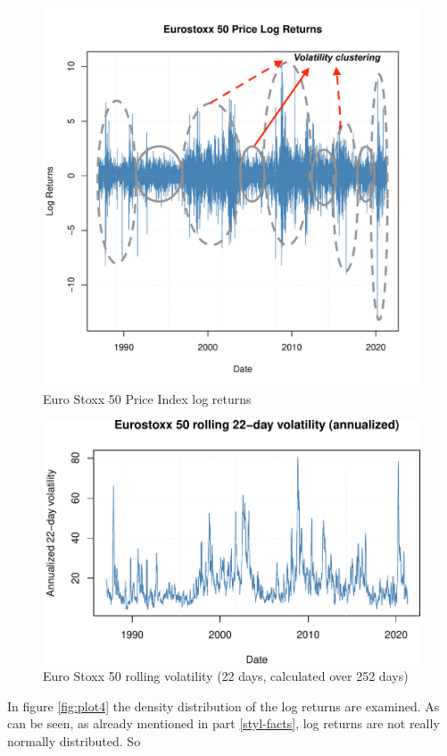 \documentclass[a4paper, twoside]{templates/ociamthesis}
\begin{document}
\begin{figure}[h]

{\centering \includegraphics[width=0.75\linewidth]{figures/vol-clustering-final} 

}

\caption{Euro Stoxx 50 Price Index log returns}\label{fig:plot2}
\end{figure}

\begin{figure}[h]

{\centering \includegraphics[width=0.75\linewidth]{_main_files/figure-latex/plot3-1} 

}

\caption{Euro Stoxx 50 rolling volatility (22 days, calculated over 252 days)}\label{fig:plot3}
\end{figure}

\newpage

\noindent In figure \ref{fig:plot4} the density distribution of the log returns are examined. As can be seen, as already mentioned in part \ref{styl-facts}, log returns are not really normally distributed. So
\end{document}
